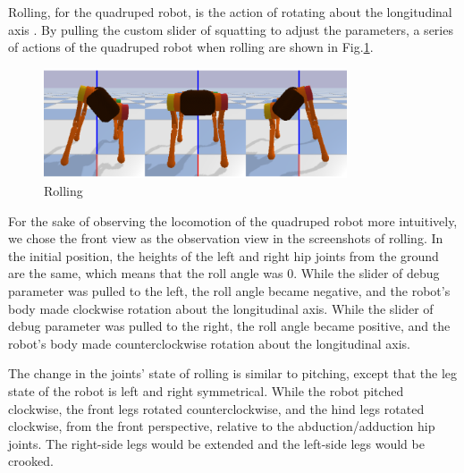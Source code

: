 Rolling, for the quadruped robot, is the action of rotating about the longitudinal axis \cite{ref:6DOF}. By pulling the custom slider of squatting to adjust the parameters, a series of actions of the quadruped robot when rolling are shown in Fig.\ref{fig: rolling}.

\begin{figure}[htbp]
    \centering
    \includegraphics[width=0.8\textwidth]{figures/rolling.png}
    \caption{Rolling}
    \label{fig: rolling}
\end{figure}

For the sake of observing the locomotion of the quadruped robot more intuitively, we chose the front view as the observation view in the screenshots of rolling. In the initial position, the heights of the left and right hip joints from the ground are the same, which means that the roll angle was 0. While the slider of debug parameter was pulled to the left, the roll angle became negative, and the robot's body made clockwise rotation about the longitudinal axis. While the slider of debug parameter was pulled to the right, the roll angle became positive, and the robot's body made counterclockwise rotation about the longitudinal axis.

The change in the joints' state of rolling is similar to pitching, except that the leg state of the robot is left and right symmetrical. While the robot pitched clockwise, the front legs rotated counterclockwise, and the hind legs rotated clockwise, from the front perspective, relative to the abduction/adduction hip joints. The right-side legs would be extended and the left-side legs would be crooked.
